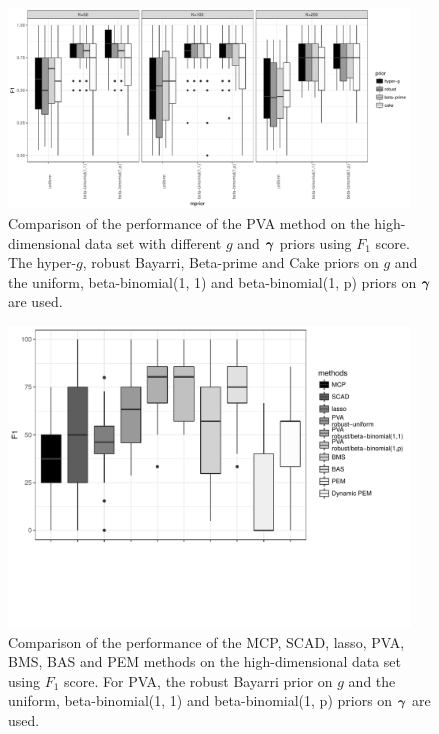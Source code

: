 \begin{figure}[h!]
	\begin{center}
		\includegraphics[width=0.95\textwidth]{./highDimPVA_F1.pdf}  
	\end{center}
	\caption{Comparison of the performance of the PVA method on the
						high-dimensional data set with different $g$ and ${\boldsymbol \gamma}$ priors using $F_1$ score.
						The hyper-$g$,
						robust Bayarri, Beta-prime and Cake priors on $g$ and the uniform, beta-binomial(1, 1) and beta-binomial(1, p) priors on ${\boldsymbol \gamma}$ are used.}
	\label{fig:highDimPVA_F1}
\end{figure}

\begin{figure}[h!]
	\begin{center}	
		\includegraphics[trim={0 4cm 0 0},width=0.95\textwidth]{./highDimPVA_F1_compare_edit.pdf}  
	\end{center}
	\caption{Comparison of the performance of the MCP, SCAD, lasso, PVA, BMS, BAS and PEM methods on the
						high-dimensional data set using $F_1$ score. For PVA, the
						robust Bayarri prior on $g$ and the uniform, beta-binomial(1, 1) and beta-binomial(1, p) priors
						on ${\boldsymbol \gamma}$ are used.}
	\label{fig:highDimPVA_F1_compare}
\end{figure}


